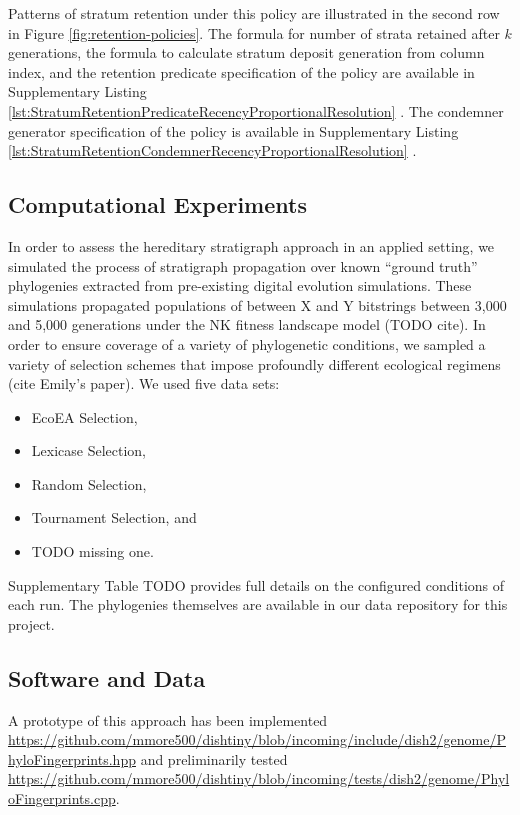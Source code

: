 Patterns of stratum retention under this policy are illustrated in the second row in Figure \ref{fig:retention-policies}.
The formula for number of strata retained after $k$ generations, the formula to calculate stratum deposit generation from column index, and the retention predicate specification of the policy are available in Supplementary Listing \ref{lst:StratumRetentionPredicateRecencyProportionalResolution} \citep{moreno2022hstratconceptsupplement}.
The condemner generator specification of the policy is available in Supplementary Listing \ref{lst:StratumRetentionCondemnerRecencyProportionalResolution} \citep{moreno2022hstratconceptsupplement}.


\subsection{Computational Experiments}

In order to assess the hereditary stratigraph approach in an applied setting, we simulated the process of stratigraph propagation over known ``ground truth'' phylogenies extracted from pre-existing digital evolution simulations.
These simulations propagated populations of between X and Y bitstrings between 3,000 and 5,000 generations under the NK fitness landscape model (TODO cite).
In order to ensure coverage of a variety of phylogenetic conditions, we sampled a variety of selection schemes that impose profoundly different ecological regimens (cite Emily's paper).
We used five data sets:
\begin{itemize}
  \item EcoEA Selection,
  \item Lexicase Selection,
  \item Random Selection,
  \item Tournament Selection, and
  \item TODO missing one.
\end{itemize}

Supplementary Table TODO provides full details on the configured conditions of each run.
The phylogenies themselves are available in our data repository for this project.


\subsection{Software and Data}

A prototype of this approach has been implemented \url{https://github.com/mmore500/dishtiny/blob/incoming/include/dish2/genome/PhyloFingerprints.hpp} and preliminarily tested \url{https://github.com/mmore500/dishtiny/blob/incoming/tests/dish2/genome/PhyloFingerprints.cpp}.


